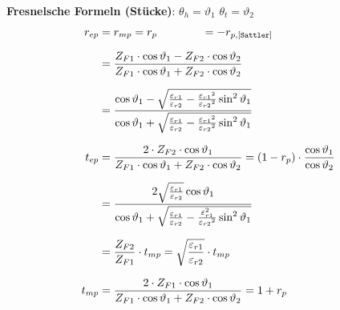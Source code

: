 \textbf{Fresnelsche Formeln (Stücke)}: \qquad $ \theta_h = \vartheta_{1} $ \quad $ \theta_t = \vartheta_{2} $
\begin{equation*}
		\setlength{\jot}{10pt}
	\begin{aligned}
		r_{ep}    & =  r_{mp} = r_{p}  \qquad \qquad =-r_{p,[\texttt{Sattler}]}
		\\
		& = \frac{Z_{F1} \cdot \cos \vartheta_1-Z_{F2} \cdot \cos \vartheta_2}{Z_{F1} \cdot \cos \vartheta_1+Z_{F2} \cdot \cos \vartheta_2}
		\\
		& =\frac{\cos \vartheta_1-\sqrt{\frac{\varepsilon_{r 1}}{\varepsilon_{r 2}}-\frac{\varepsilon_{r 1}{ }^2}{\varepsilon_{r 2}{ }^2} \sin ^2 \vartheta_1}}{\cos \vartheta_1+\sqrt{\frac{\varepsilon_{r 1}}{\varepsilon_{r 2}}-\frac{\varepsilon_{r 1}{ }^2}{\varepsilon_{r 2}{ }^2} \sin ^2 \vartheta_1}} \\
		t_{ep} & =  \frac{2 \cdot Z_{F2}   \cdot  \cos \vartheta_1}{Z_{F1} \cdot \cos \vartheta_1+Z_{F2} \cdot \cos \vartheta_2}                                                                                                                           = (1-r_p) \cdot \dfrac{\cos \vartheta_1}{\cos \vartheta_2}                                                                                                                                                                        \\
		& = \frac{2 \sqrt{\frac{\varepsilon_{r 1}}{\varepsilon_{r 2}}} \cos \vartheta_1}{\cos \vartheta_1+\sqrt{\frac{\varepsilon_{r 1}}{\varepsilon_{r 2}}-\frac{\varepsilon_{r 1}^2}{\varepsilon_{r 2}{ }^2} \sin ^2 \vartheta_1}} \\
		& = \frac{Z_{F2}}{Z_{F1}}\cdot t_{mp} = \sqrt{\frac{\varepsilon_{r1}}{\varepsilon_{r2}}}\cdot t_{mp} \\
		t_{mp} & = \frac{2 \cdot  Z_{F1}\cdot \cos \vartheta_1}{Z_{F1} \cdot \cos \vartheta_1+Z_{F2} \cdot \cos \vartheta_2}                                                                                                                          
		= 1+r_p                                                                                                                                                                                                                
	\end{aligned}
\end{equation*}
